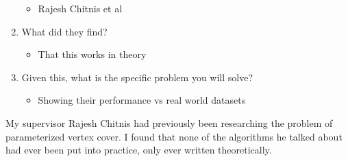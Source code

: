 \begin{enumerate}
    \begin{itemize}
        \item Rajesh Chitnis et al
    \end{itemize}
    \item What did they find?
    \begin{itemize}
        \item That this works in theory 
    \end{itemize}
    \item Given this, what is the specific problem you will solve?
    \begin{itemize}
        \item Showing their performance vs real world datasets 
    \end{itemize}
\end{enumerate}


My supervisor Rajesh Chitnis had previously been researching the problem of parameterized vertex cover. I found that none of the algorithms he talked about had ever been put into practice, only ever written theoretically. 